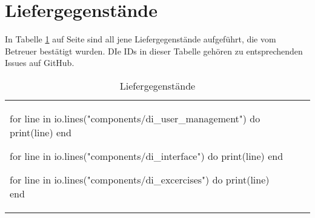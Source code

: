 \section{Liefergegenstände}\label{sec:deliveryitems}

In Tabelle \ref{tab:deliveryitems} auf Seite \pageref{tab:deliveryitems} sind all jene Liefergegenstände aufgeführt, die vom Betreuer bestätigt wurden.
DIe IDs in dieser Tabelle gehören zu entsprechenden Issues auf GitHub.

\newcommand\luainput[1]{\begin{luacode}for line in io.lines("{#1}") do print(line) end \end{luacode}}

\begin{table}

\caption{Liefergegenstände}\label{tab:deliveryitems}

\begin{tabularx}{\textwidth}{llX}
\luainput{components/di_user_management}
\luainput{components/di_interface}
\luainput{components/di_excercises}
\end{tabularx}
\end{table}
